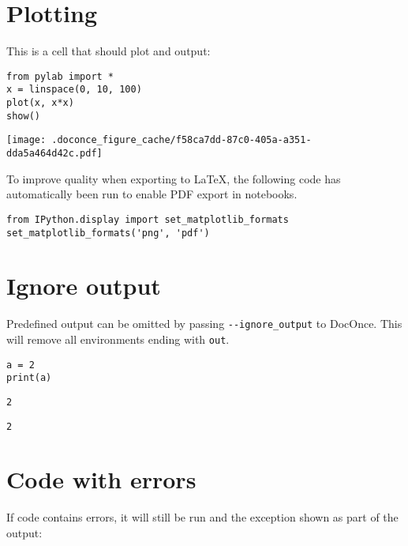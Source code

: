 \documentclass[%
oneside,                 %
final,                   %
chapterprefix=true,      %
open=right,              %
10pt]{book}
\begin{document}
\section{Plotting}

This is a cell that should plot and output:

\begin{Verbatim}[numbers=none,fontsize=\fontsize{9pt}{9pt},baselinestretch=0.95]
from pylab import *
x = linspace(0, 10, 100)
plot(x, x*x)
show()
\end{Verbatim}
\begin{center}
   \texttt{[image: .doconce\_figure\_cache/f58ca7dd-87c0-405a-a351-dda5a464d42c.pdf]}
\end{center}


To improve quality when exporting to {\LaTeX}, the following code has automatically
been run to enable PDF export in notebooks.

\begin{Verbatim}[numbers=none,fontsize=\fontsize{9pt}{9pt},baselinestretch=0.95]
from IPython.display import set_matplotlib_formats
set_matplotlib_formats('png', 'pdf')
\end{Verbatim}

\section{Ignore output}

Predefined output can be omitted by passing \Verb!--ignore_output! to DocOnce.
This will remove all environments ending with \texttt{out}.

\begin{Verbatim}[numbers=none,fontsize=\fontsize{9pt}{9pt},baselinestretch=0.95]
a = 2
print(a)
\end{Verbatim}
\begin{Verbatim}[numbers=none,fontsize=\fontsize{9pt}{9pt},baselinestretch=0.95]
2
\end{Verbatim}

\begin{Verbatim}[numbers=none,fontsize=\fontsize{9pt}{9pt},baselinestretch=0.95]
2
\end{Verbatim}

\section{Code with errors}

If code contains errors, it will still be run and the exception shown as part
of the output:
\end{document}
